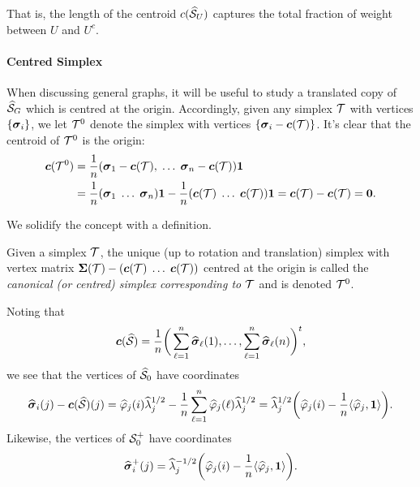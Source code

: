 That is, the length of the centroid $c(\widehat{\mathcal{S}}_U)$ captures the total fraction of weight between $U$ and $U^c$. 

\paragraph{Centred  Simplex}


When discussing general graphs, it will be useful to study a  translated copy of $\widehat{\mathcal{S}}_G$ which is centred at the origin. Accordingly, given any simplex $\mathcal{T}$ with vertices $\{\vb*{\sigma}_i\}$, we let $\mathcal{T}^0$ denote the simplex with vertices $\{\vb*{\sigma}_i - \vb*{c}(\mathcal{T})\}$. It's clear that the centroid of $\mathcal{T}^0$ is the origin: 
\begin{align*}
\vb*{c}(\mathcal{T}^0) 
&= \frac{1}{n}(\vb*{\sigma}_1-\vb*{c}(\mathcal{T}),\;\dots\;\vb*{\sigma}_n-\vb*{c}(\mathcal{T}))\vb{1} \\
&= \frac{1}{n}(\vb*{\sigma}_1\;\dots\;\vb*{\sigma}_n)\vb{1} - \frac{1}{n}(\vb*{c}(\mathcal{T})\;\dots\;\vb*{c}(\mathcal{T}))\vb{1} = \vb*{c}(\mathcal{T}) - \vb*{c}(\mathcal{T})=\vb{0}.
\end{align*}

We solidify the concept with a definition. 

\begin{definition}
	Given a simplex $\mathcal{T}$, the unique (up to rotation and translation) simplex with vertex matrix $\boldsymbol{\Sigma}(\mathcal{T}) - (\vb*{c}(\mathcal{T})\;\dots\;\vb*{c}(\mathcal{T}))$ centred at the origin is called the \emph{canonical (or centred) simplex corresponding to $\mathcal{T}$} and is denoted $\mathcal{T}^0$. 
\end{definition}

Noting that 
\begin{equation*}
\vb*{c}(\widehat{\mathcal{S}}) = \frac{1}{n}\bigg(\sum_{\ell=1}^n \widehat{\vb*{\sigma}}_\ell(1),\dots,\sum_{\ell=1}^n \widehat{\vb*{\sigma}}_\ell(n)\bigg)^t,
\end{equation*}
we see that the vertices of $\widehat{\mathcal{S}}_0$ have coordinates
\begin{equation*}
\widehat{\vb*{\sigma}}_i(j) - \vb*{c}(\widehat{\mathcal{S}})(j) = \widehat{\varphi}_j(i)\widehat{\lambda}_j^{1/2} - \frac{1}{n}\sum_{\ell=1}^n \widehat{\varphi}_j(\ell)\widehat{\lambda}_j^{1/2} = \widehat{\lambda}_j^{1/2} \bigg(\widehat{\varphi}_j(i) - \frac{1}{n}\langle \widehat{\varphi}_j,\vb{1}\rangle \bigg).
\end{equation*}
Likewise, the vertices of $\mathcal{S}_0^+$ have coordinates 
\begin{equation*}
\widehat{\vb*{\sigma}}_i^+(j) = \widehat{\lambda}_j^{-1/2}\bigg(\widehat{\varphi}_j(i) - \frac{1}{n}\langle \widehat{\varphi}_j,\vb{1}\rangle\bigg).
\end{equation*}

